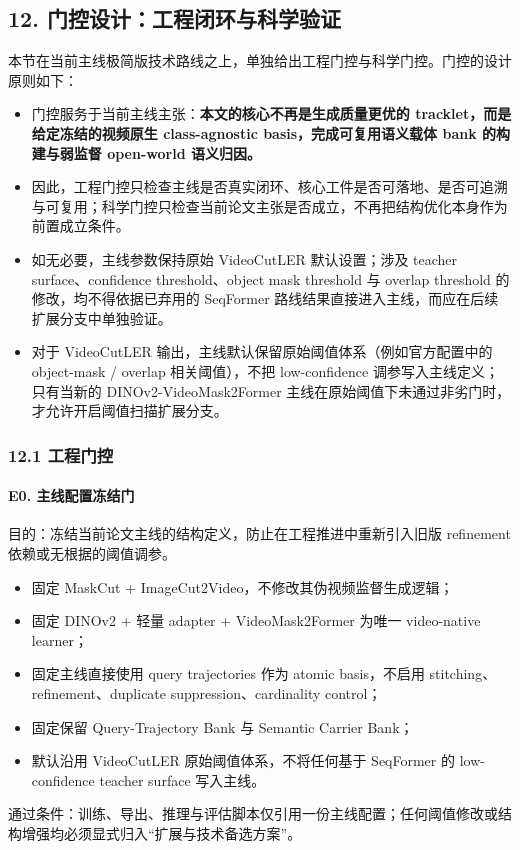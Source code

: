 \documentclass[UTF8]{ctexart}
\begin{document}
\par\noindent\hrulefill\par

\subsection*{12. 门控设计：工程闭环与科学验证}
本节在当前主线极简版技术路线之上，单独给出工程门控与科学门控。门控的设计原则如下：
\begin{itemize}
\item 门控服务于当前主线主张：\textbf{本文的核心不再是生成质量更优的 tracklet，而是给定冻结的视频原生 class-agnostic basis，完成可复用语义载体 bank 的构建与弱监督 open-world 语义归因。}
\item 因此，工程门控只检查主线是否真实闭环、核心工件是否可落地、是否可追溯与可复用；科学门控只检查当前论文主张是否成立，不再把结构优化本身作为前置成立条件。
\item 如无必要，主线参数保持原始 VideoCutLER 默认设置；涉及 teacher surface、confidence threshold、object mask threshold 与 overlap threshold 的修改，均不得依据已弃用的 SeqFormer 路线结果直接进入主线，而应在后续扩展分支中单独验证。
\item 对于 VideoCutLER 输出，主线默认保留原始阈值体系（例如官方配置中的 object-mask / overlap 相关阈值），不把 low-confidence 调参写入主线定义；只有当新的 DINOv2-VideoMask2Former 主线在原始阈值下未通过非劣门时，才允许开启阈值扫描扩展分支。
\end{itemize}

\subsubsection*{12.1 工程门控}

\paragraph{E0. 主线配置冻结门}
目的：冻结当前论文主线的结构定义，防止在工程推进中重新引入旧版 refinement 依赖或无根据的阈值调参。
\begin{itemize}
\item 固定 MaskCut + ImageCut2Video，不修改其伪视频监督生成逻辑；
\item 固定 DINOv2 + 轻量 adapter + VideoMask2Former 为唯一 video-native learner；
\item 固定主线直接使用 query trajectories 作为 atomic basis，不启用 stitching、refinement、duplicate suppression、cardinality control；
\item 固定保留 Query-Trajectory Bank 与 Semantic Carrier Bank；
\item 默认沿用 VideoCutLER 原始阈值体系，不将任何基于 SeqFormer 的 low-confidence teacher surface 写入主线。
\end{itemize}
通过条件：训练、导出、推理与评估脚本仅引用一份主线配置；任何阈值修改或结构增强均必须显式归入“扩展与技术备选方案”。
\end{document}
